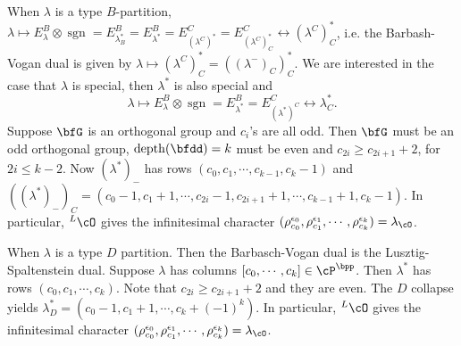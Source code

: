 \documentclass[12pt,a4paper]{amsart}
\newcommand{\depth}{\mathrm{depth}}
\newcommand{\CO}{{\mathcal {O}}}
\newcommand{\CV}{{\mathcal {V}}}
\newcommand{\gr}{\operatorname{gr}}
\newcommand{\sgn}{\operatorname{sgn}}
\newcommand{\oS}{\operatorname{S}}
\numberwithin{equation}{section}
\theoremstyle{remark}
\begin{document}
{  When $\lambda$ is
  a type $B$-partition,  $\lambda \mapsto E^B_\lambda\otimes \sgn =
  E^B_{\lambda^*_B} = E^B_{\lambda^*} = E^C_{(\lambda^C)^*} =
  E^C_{(\lambda^C)^*_C} \leftrightarrow (\lambda^C)^*_C$, i.e.
  the Barbash-Vogan dual is given by $\lambda \mapsto (\lambda^C)^*_C =
  ((\lambda^-)_C)^*_C $.
  We are interested in the case that $\lambda$ is special, then $\lambda^*$ is
  also special and
  \[ \lambda \mapsto E^B_{\lambda}\otimes \sgn  =
  E^B_{\lambda^*} = E^C_{(\lambda^*)^C} \leftrightarrow \lambda^*_C.
  \]
  Suppose $\bfG$ is an orthogonal group and $c_i$'s are all odd. Then
  $\bfG$ must be an odd orthogonal group,
  $\depth(\bfdd)=k$ must be even and $c_{2i}\geq c_{2i+1}+2$, for $2i\leq k-2$.
  Now $(\lambda^*)_-$  has rows $(c_0,c_1, \cdots, c_{k-1}, c_k-1)$
  and
  $((\lambda^*)_-)_C = (c_0-1,c_1+1, \cdots, c_{2i}-1,c_{2i+1}+1,\cdots,
  c_{k-1}+1,c_k-1)$.  In particular, ${^{L}\cO}$ gives the infinitesimal
  character
  $ (\rho^{\epsilon_0}_{c_0}, \rho^{\epsilon_1}_{c_1},\cdots,
  \rho^{\epsilon_k}_{c_k})=\lambda_{\cO}$.

  When $\lambda$ is a type $D$ partition. Then the Barbasch-Vogan dual is the
  Lusztig-Spaltenstein dual.
  Suppose $\lambda$ has columns $[c_0,\cdots, c_k]\in \cP^\bpp$. Then
  $\lambda^*$ has rows $(c_0, c_1,\cdots, c_k)$. Note that $c_{2i}\geq c_{2i+1}
  +2$ and they are even. The $D$ collapse yields $\lambda^*_D = (c_0-1,c_1+1, \cdots, c_k
  +(-1)^k)$. In particular, ${^{L}\cO}$ gives the infinitesimal
  character
  $ (\rho^{\epsilon_0}_{c_0}, \rho^{\epsilon_1}_{c_1},\cdots,
  \rho^{\epsilon_k}_{c_k})=\lambda_{\cO}$.
}





\end{document}
